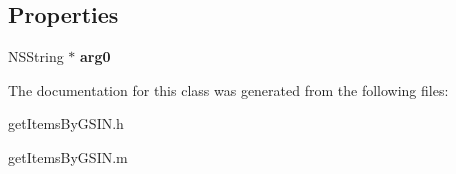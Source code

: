 \subsection*{Properties}
\begin{DoxyCompactItemize}
\item 
\hypertarget{interfaceget_items_by_g_s_i_n_a387bd284c6c5cbe7253751ac57e58006}{}N\+S\+String $\ast$ {\bfseries arg0}\label{interfaceget_items_by_g_s_i_n_a387bd284c6c5cbe7253751ac57e58006}

\end{DoxyCompactItemize}


The documentation for this class was generated from the following files\+:\begin{DoxyCompactItemize}
\item 
get\+Items\+By\+G\+S\+I\+N.\+h\item 
get\+Items\+By\+G\+S\+I\+N.\+m\end{DoxyCompactItemize}
